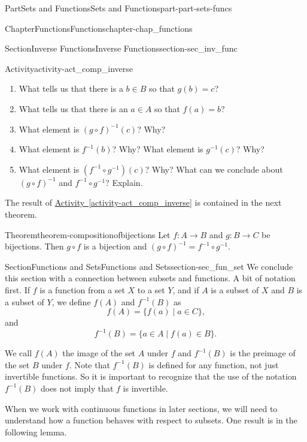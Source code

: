 \documentclass[oneside,10pt,]{book}
\newcommand{\xreffont}{\relax}
\numberwithin{equation}{chapter}
\begin{document}
\begin{partptx}{Part}{Sets and Functions}{}{Sets and Functions}{}{}{part-part-sets-funcs}
\begin{chapterptx}{Chapter}{Functions}{}{Functions}{}{}{chapter-chap_functions}
\begin{sectionptx}{Section}{Inverse Functions}{}{Inverse Functions}{}{}{section-sec_inv_func}
\begin{activity}{Activity}{}{activity-act_comp_inverse}
\begin{enumerate}[font=\bfseries,label=(\alph*),ref=\alph*]
\begin{enumerate}[font=\bfseries,label=(\roman*),ref=\theenumi.\roman*]
\item{}What tells us that there is a \(b \in B\) so that \(g(b) = c\)?%
\item{}What tells us that there is an \(a \in A\) so that \(f(a) = b\)?%
\item{}What element is \((g \circ f)^{-1}(c)\)? Why?%
\item{}What element is \(f^{-1}(b)\)? Why? What element is \(g^{-1}(c)\)? Why?%
\item{}What element is \((f^{-1} \circ g^{-1})(c)\)? Why? What can we conclude about \((g \circ f)^{-1}\) and \(f^{-1} \circ g^{-1}\)? Explain.%
\end{enumerate}%
\end{enumerate}%
\end{activity}%
The result of \hyperref[activity-act_comp_inverse]{Activity~{\xreffont\ref{activity-act_comp_inverse}}} is contained in the next theorem.%
\begin{theorem}{Theorem}{}{}{theorem-compositionofbijections}%
Let \(f: A \to B\) and \(g: B \to C\) be bijections. Then \(g \circ f\) is a bijection and \(( {g \circ f} )^{ - 1} = f^{ - 1} \circ g^{ - 1}\).%
\end{theorem}
\end{sectionptx}
%
%
\typeout{************************************************}
\typeout{************************************************}
%
\begin{sectionptx}{Section}{Functions and Sets}{}{Functions and Sets}{}{}{section-sec_fun_set}
We conclude this section with a connection between subsets and functions. A bit of notation first. If \(f\) is a function from a set \(X\) to a set \(Y\), and if \(A\) is a subset of \(X\) and \(B\) is a subset of \(Y\), we define \(f(A)\) and \(f^{-1}(B)\) as%
\begin{equation*}
f(A) = \{f(a) \mid a \in C\}\text{,}
\end{equation*}
and%
\begin{equation*}
f^{-1}(B) = \{a \in A \mid f(a) \in B\}\text{.}
\end{equation*}
%
\par
We call \(f(A)\) the image of the set \(A\) under \(f\) and \(f^{-1}(B)\) is the preimage of the set \(B\) under \(f\). Note that \(f^{-1}(B)\) is defined for any function, not just invertible functions. So it is important to recognize that the use of the notation \(f^{-1}(B)\) does not imply that \(f\) is invertible.%
\par
When we work with continuous functions in later sections, we will need to understand how a function behaves with respect to subsets. One result is in the following lemma.%

\end{sectionptx}
\end{chapterptx}
\end{partptx}
\end{document}
